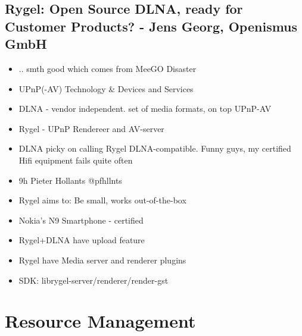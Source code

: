 \documentclass[10pt]{article}
\begin{document}
{\subsection{Rygel: Open Source DLNA, ready for Customer Products? - Jens Georg, Openismus GmbH}
\begin{itemize}
\item .. smth good which comes from MeeGO Disaster
\item UPnP(-AV) Technology \& Devices and Services
\item DLNA - vendor independent. set of media formats, on top UPnP-AV
\item Rygel - UPnP Rendereer and AV-server
\item DLNA picky on calling Rygel DLNA-compatible. Funny guys, my certified Hifi equipment fails quite often 
\item 9h Pieter Hollants @pfhllnts
\item Rygel aims to: Be small, works out-of-the-box
\item Nokia's N9 Smartphone - certified
\item Rygel+DLNA have upload feature
\item Rygel have Media server and renderer plugins
\item SDK: librygel-server/renderer/render-gst
\end{itemize}

\section{Resource Management}
}
\end{document}
